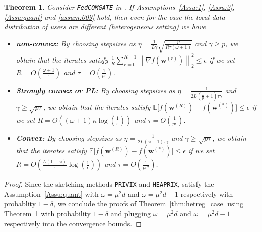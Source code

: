 \documentclass[twoside]{article}
\newtheorem{theorem}{Theorem}
\begin{document}
\begin{theorem}\label{thm:fromhaddad-het}
 Consider \texttt{FedCOMGATE} in \cite{haddadpour2020federated}. If Assumptions~\ref{Assu:1}, \ref{Assu:2}, \ref{Assu:quant}  and \ref{assum:009} hold, then even for the case the local data distribution of users are different  (heterogeneous setting) we have
 \begin{itemize}
     \item \textbf{non-convex:} By choosing stepsizes as $\eta=\frac{1}{L\gamma}\sqrt{\frac{p}{R\tau\left(\omega+1\right)}}$ and $\gamma\geq p$, we obtain that the iterates satisfy  $\frac{1}{R}\sum_{r=0}^{R-1}\left\|\nabla f({\boldsymbol{w}}^{(r)})\right\|_2^2\leq \epsilon$ if we set
     $R=O\left(\frac{\omega+1}{\epsilon}\right)$ and $ \tau=O\left(\frac{1}{p\epsilon}\right)$.
     \item \textbf{Strongly convex or PL:}
      By choosing stepsizes as $\eta=\frac{1}{2L\left(\frac{\omega}{p}+1\right)\tau\gamma}$ and ${\gamma\geq \sqrt{p\tau}}$, we obtain that the iterates satisfy $\mathbb{E}\Big[f({\boldsymbol{w}}^{(R)})-f({\boldsymbol{w}}^{(*)})\Big]\leq \epsilon$ if we set
      $R=O\left(\left(\omega+1\right)\kappa\log\left(\frac{1}{\epsilon}\right)\right)$ and $ \tau=O\left(\frac{1}{p\epsilon}\right)$.
     \item \textbf{Convex:}  By choosing stepsizes as $\eta=\frac{1}{2L\left(\omega+1\right)\tau\gamma}$ and ${\gamma\geq \sqrt{p\tau}}$, we obtain that the iterates satisfy $\mathbb{E}\Big[f({\boldsymbol{w}}^{(R)})-f({\boldsymbol{w}}^{(*)})\Big]\leq \epsilon$ if we set
     $R=O\left(\frac{L\left(1+\omega\right)}{\epsilon}\log\left(\frac{1}{\epsilon}\right)\right)$ and $ \tau=O\left(\frac{1}{p\epsilon^2}\right)$.
 \end{itemize}
 
\end{theorem}
\begin{proof}
Since the sketching methods \texttt{PRIVIX} and \texttt{HEAPRIX}, satisfy the Assumption~\ref{Assu:quant} with $\omega=\mu^2d$ and $\omega=\mu^2d-1$ respectively with probablity $1-\delta$, we conclude the proofs of Theorem~\ref{thm:hetreg_case} using Theorem~\ref{thm:fromhaddad-het} with probability $1-\delta$ and plugging $\omega=\mu^2d$ and $\omega=\mu^2d-1$ respectively into the convergence bounds.
\end{proof}
\end{document}
